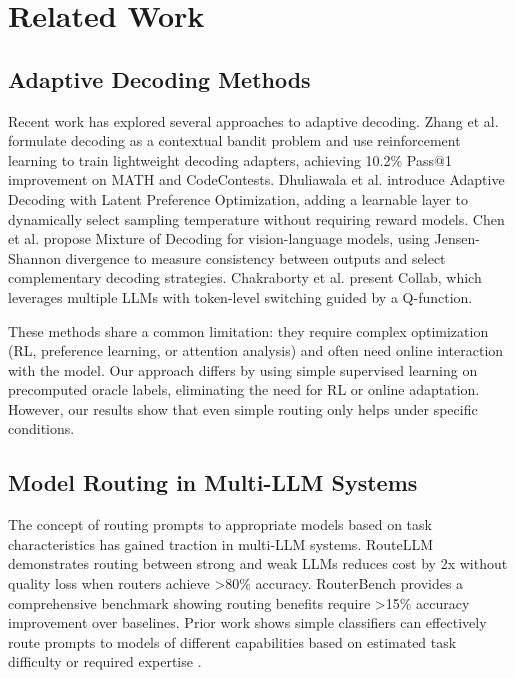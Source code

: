 \documentclass[11pt,letterpaper]{article}
\begin{document}
\section{Related Work}

\subsection{Adaptive Decoding Methods}

Recent work has explored several approaches to adaptive decoding. Zhang et al. \cite{Zhang2026} formulate decoding as a contextual bandit problem and use reinforcement learning to train lightweight decoding adapters, achieving 10.2\% Pass@1 improvement on MATH and CodeContests. Dhuliawala et al. \cite{Dhuliawala2024} introduce Adaptive Decoding with Latent Preference Optimization, adding a learnable layer to dynamically select sampling temperature without requiring reward models. Chen et al. \cite{Chen2025} propose Mixture of Decoding for vision-language models, using Jensen-Shannon divergence to measure consistency between outputs and select complementary decoding strategies. Chakraborty et al. \cite{Chakraborty2025} present Collab, which leverages multiple LLMs with token-level switching guided by a Q-function.

These methods share a common limitation: they require complex optimization (RL, preference learning, or attention analysis) and often need online interaction with the model. Our approach differs by using simple supervised learning on precomputed oracle labels, eliminating the need for RL or online adaptation. However, our results show that even simple routing only helps under specific conditions.

\subsection{Model Routing in Multi-LLM Systems}

The concept of routing prompts to appropriate models based on task characteristics has gained traction in multi-LLM systems. RouteLLM \cite{Ong2024} demonstrates routing between strong and weak LLMs reduces cost by 2x without quality loss when routers achieve >80\% accuracy. RouterBench \cite{Hu2024} provides a comprehensive benchmark showing routing benefits require >15\% accuracy improvement over baselines. Prior work shows simple classifiers can effectively route prompts to models of different capabilities based on estimated task difficulty or required expertise \cite{Lu2024}.
\end{document}
